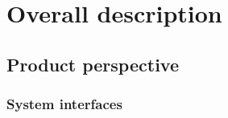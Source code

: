 \section{Overall description}


\subsection{Product perspective}

\subsubsection{System interfaces}


